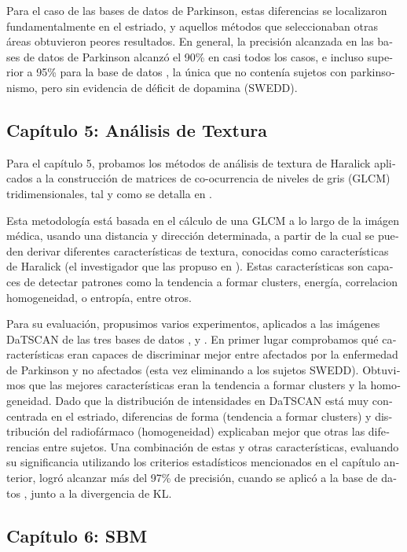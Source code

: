 \begin{otherlanguage}{spanish}
Para el caso de las bases de datos de Parkinson, estas diferencias se localizaron fundamentalmente en el estriado, y aquellos métodos que seleccionaban otras áreas obtuvieron peores resultados. En general, la precisión alcanzada en las bases de datos de Parkinson alcanzó el 90\% en casi todos los casos, e incluso superior a 95\% para la base de datos \vdlvdat{}, la única que no contenía sujetos con parkinsonismo, pero sin evidencia de déficit de dopamina (\acs{SWEDD}). 


\subsection*{Capítulo 5: Análisis de Textura}
Para el capítulo 5, probamos los métodos de análisis de textura de Haralick aplicados a la construcción de matrices de co-ocurrencia de niveles de gris (\acs{GLCM}) tridimensionales, tal y como se detalla en \cite{Martinez-Murcia2013266,martinez2014parametrization}. 

Esta metodología está basada en el cálculo de una \acs{GLCM} a lo largo de la imágen médica, usando una distancia y dirección determinada, a partir de la cual se pueden derivar diferentes características de textura, conocidas como características de Haralick (el investigador que las propuso en \cite{Haralick73}). Estas características son capaces de detectar patrones como la tendencia a formar clusters, energía, correlacion homogeneidad, o entropía, entre otros. 

Para su evaluación, propusimos varios experimentos, aplicados a las imágenes DaTSCAN de las tres bases de datos \vdlndat{}, \vdlvdat{} y \ppmidat{}. En primer lugar comprobamos qué características eran capaces de discriminar mejor entre afectados por la enfermedad de Parkinson y no afectados (esta vez eliminando a los sujetos \acs{SWEDD}). Obtuvimos que las mejores características eran la tendencia a formar clusters y la homogeneidad. Dado que la distribución de intensidades en DaTSCAN está muy concentrada en el estriado, diferencias de forma (tendencia a formar clusters) y distribución del radiofármaco (homogeneidad) explicaban mejor que otras las diferencias entre sujetos. Una combinación de estas y otras características, evaluando su significancia utilizando los criterios estadísticos mencionados en el capítulo anterior, logró alcanzar más del 97\% de precisión, cuando se aplicó a la base de datos \ppmidat{}, junto a la divergencia de \acs{KL}.


\subsection*{Capítulo 6: \acf{SBM}} 
\cite{Martinez-Murcia2014225,Martinez-Murcia2015,Martinez-MurciaVRLBP,Martinez-Murcia2016}


\end{otherlanguage}
